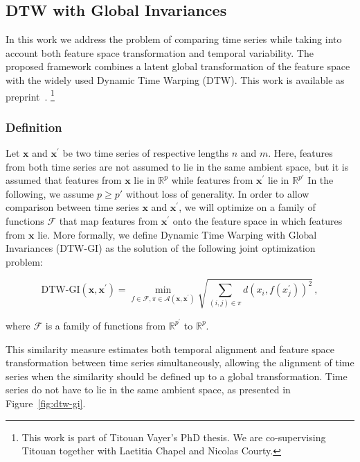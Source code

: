 \subsection{DTW with Global Invariances}
\label{sec:dtw_gi}

In this work we address the problem of comparing time series while taking
into account both feature space transformation and temporal variability.
The proposed framework combines a latent global transformation of the feature
space with the widely used Dynamic Time Warping (DTW).
This work is available as preprint~\cite{vayer2020time}.%
\footnote{This work is part of Titouan Vayer's PhD thesis.
We are co-supervising Titouan together with Laetitia Chapel and Nicolas Courty.}

\subsubsection{Definition}

Let $\mathbf{x}$ and $\mathbf{x^\prime}$ be two time series of respective
lengths $n$ and $m$.
Here, features from both time series are not assumed to lie in the same ambient
space, but it is assumed that features from $\mathbf{x}$ lie in $\mathbb{R}^p$
while features from $\mathbf{x^\prime}$ lie in $\mathbb{R}^{p'}$
In the following, we assume $p \geq p'$ without loss of generality.
In order to allow comparison between time series $\mathbf{x}$ and
$\mathbf{x^\prime}$,
we will optimize on a family of functions $\mathcal{F}$ that map features from
$\mathbf{x^\prime}$ onto the feature space in which features from $\mathbf{x}$
lie. More formally, we define Dynamic Time Warping with Global Invariances
(DTW-GI) as the solution of the following joint optimization problem:

\begin{equation}
    \text{DTW-GI}(\mathbf{x}, \mathbf{x^\prime}) =
        \min_{f \in \mathcal{F}, \pi \in \mathcal{A}(\mathbf{x}, \mathbf{x^\prime})}
            \sqrt{ \sum_{(i, j) \in \pi} d(x_i, f(x^\prime_j))^2 } \, ,
    \label{eq:dtwgi}
\end{equation}

where $\mathcal{F}$ is a family of functions from $\mathbb{R}^{p^\prime}$ to
$\mathbb{R}^{p}$.

This similarity measure estimates both temporal alignment and feature space
transformation between time series simultaneously, allowing the alignment of
time series when the similarity should be defined up to a global transformation.
Time series do not have to lie in the same ambient space, as presented in
Figure~\ref{fig:dtw-gi}.

